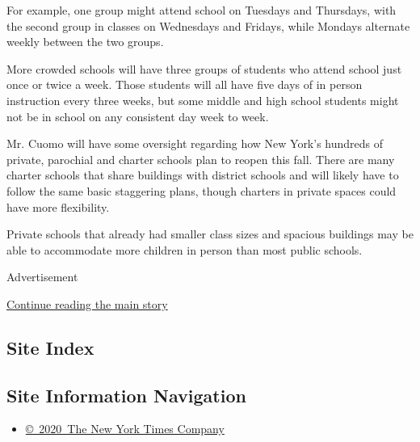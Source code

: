 For example, one group might attend school on Tuesdays and Thursdays,
with the second group in classes on Wednesdays and Fridays, while
Mondays alternate weekly between the two groups.

More crowded schools will have three groups of students who attend
school just once or twice a week. Those students will all have five days
of in person instruction every three weeks, but some middle and high
school students might not be in school on any consistent day week to
week.

Mr. Cuomo will have some oversight regarding how New York's hundreds of
private, parochial and charter schools plan to reopen this fall. There
are many charter schools that share buildings with district schools and
will likely have to follow the same basic staggering plans, though
charters in private spaces could have more flexibility.

Private schools that already had smaller class sizes and spacious
buildings may be able to accommodate more children in person than most
public schools.

Advertisement

\protect\hyperlink{after-bottom}{Continue reading the main story}

\hypertarget{site-index}{%
\subsection{Site Index}\label{site-index}}

\hypertarget{site-information-navigation}{%
\subsection{Site Information
Navigation}\label{site-information-navigation}}

\begin{itemize}
\tightlist
\item
  \href{https://help.nytimes.com/hc/en-us/articles/115014792127-Copyright-notice}{©~2020~The
  New York Times Company}
\end{itemize}

